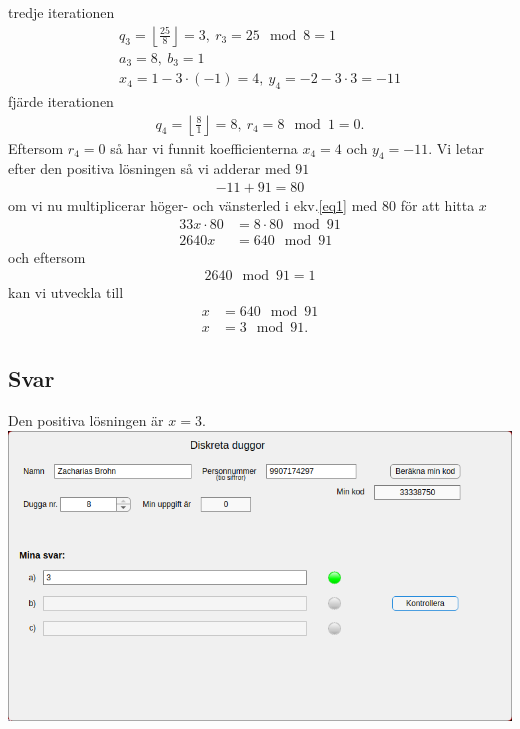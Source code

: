 \documentclass[a4paper,12pt]{article}
\begin{document}
tredje iterationen
\begin{gather}
    q_3 = \left\lfloor \frac{25}{8} \right\rfloor = 3,~r_3 = 25 \mod 8 = 1 \\
    a_3 = 8,~b_3 = 1 \\
    x_4 = 1 - 3 \cdot (-1) = 4,~y_4 = -2 - 3 \cdot 3 = -11
\end{gather}
fjärde iterationen
\begin{gather}
    q_4 = \left\lfloor \frac{8}{1} \right\rfloor = 8,~r_4 = 8 \mod 1 = 0.
\end{gather}
Eftersom $r_4 = 0$ så har vi funnit koefficienterna $x_4 = 4$ och
$y_4 = -11$. Vi letar efter den positiva
lösningen så vi adderar med $91$
\begin{gather}
    -11 + 91 = 80
\end{gather}
om vi nu multiplicerar höger- och vänsterled i ekv.\ref{eq1} med $80$ för att hitta $x$
\begin{align}
    33x \cdot 80 &= 8 \cdot 80 \mod 91 \\
    2640x &= 640 \mod 91
\end{align}
och eftersom
\begin{align*}
    2640 \mod 91 = 1
\end{align*}
kan vi utveckla till
\begin{align*}
    x &= 640 \mod 91 \\
    x &= 3 \mod 91.
\end{align*}
%
\subsection*{Svar}
Den positiva lösningen är $x = 3$. \\
%
\newpage
\includegraphics[width=\textwidth]{Nn7932X.png}
\end{document}
